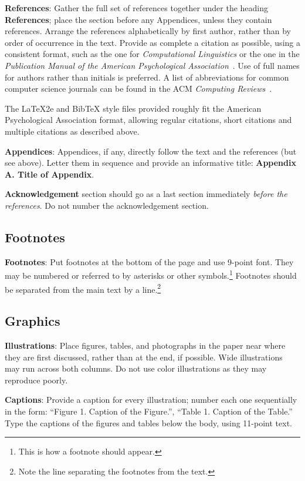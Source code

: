 \documentclass[11pt]{article}
\begin{document}
\textbf{References}: Gather the full set of references together under
the heading {\bf References}; place the section before any Appendices,
unless they contain references. Arrange the references alphabetically
by first author, rather than by order of occurrence in the text.
Provide as complete a citation as possible, using a consistent format,
such as the one for {\em Computational Linguistics\/} or the one in the
{\em Publication Manual of the American
Psychological Association\/}~\cite{APA:83}.  Use of full names for
authors rather than initials is preferred.  A list of abbreviations
for common computer science journals can be found in the ACM
{\em Computing Reviews\/}~\cite{ACM:83}.

The \LaTeX2e{} and Bib\TeX{} style files provided roughly fit the
American Psychological Association format, allowing regular citations,
short citations and multiple citations as described above.

{\bf Appendices}: Appendices, if any, directly follow the text and the
references (but see above).  Letter them in sequence and provide an
informative title: {\bf Appendix A. Title of Appendix}.

\textbf{Acknowledgement} section should go as a last section immediately
\textit{before the references}.  Do not number the acknowledgement section.

\subsection{Footnotes}

{\bf Footnotes}: Put footnotes at the bottom of the page and use
9-point font. They may be numbered or referred to by asterisks or
other symbols.\footnote{This is how a footnote should appear.}
Footnotes should be separated from the main text by a
line.\footnote{Note the line separating the footnotes from the text.}

\subsection{Graphics}

{\bf Illustrations}: Place figures, tables, and photographs in the
paper near where they are first discussed, rather than at the end, if
possible.  Wide illustrations may run across both columns. Do not use
color illustrations as they may reproduce poorly.

{\bf Captions}: Provide a caption for every illustration; number
each one sequentially in the form:  ``Figure 1. Caption of the
Figure.'', ``Table 1. Caption of the Table.''  Type the captions of
the figures and tables below the body, using 11-point text.
\end{document}
